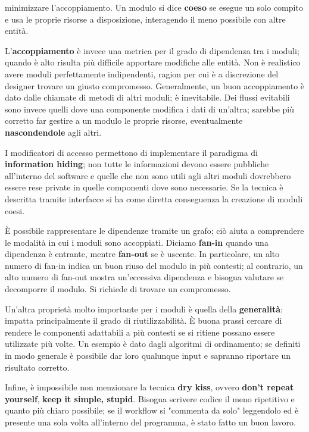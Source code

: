 minimizzare l'accoppiamento. Un modulo si dice \textbf{coeso} se esegue un solo compito e usa le proprie risorse a disposizione, interagendo il meno
possibile con altre entità.\par
L'\textbf{accoppiamento} è invece una metrica per il grado di dipendenza tra i moduli; quando è alto risulta più difficile apportare modifiche alle
entità. Non è realistico avere moduli perfettamente indipendenti, ragion per cui è a discrezione del designer trovare un giusto compromesso.
Generalmente, un buon accoppiamento è dato dalle chiamate di metodi di altri moduli; è inevitabile. Dei flussi evitabili sono invece quelli dove una
componente modifica i dati di un'altra; sarebbe più corretto far gestire a un modulo le proprie risorse, eventualmente \textbf{nascondendole} agli
altri.\par
I modificatori di accesso permettono di implementare il paradigma di \textbf{information hiding}; non tutte le informazioni devono essere pubbliche
all'interno del software e quelle che non sono utili agli altri moduli dovrebbero essere rese private in quelle componenti dove sono necessarie. Se la
tecnica è descritta tramite interfacce si ha come diretta conseguenza la creazione di moduli coesi.\newline

\noindent È possibile rappresentare le dipendenze tramite un grafo; ciò aiuta a comprendere le modalità in cui i moduli sono accoppiati. Diciamo
\textbf{fan-in} quando una dipendenza è entrante, mentre \textbf{fan-out} se è uscente. In particolare, un alto numero di fan-in indica un buon riuso
del modulo in più contesti; al contrario, un alto numero di fan-out mostra un'eccessiva dipendenza e bisogna valutare se decomporre il modulo. Si
richiede di trovare un compromesso.\par
Un'altra proprietà molto importante per i moduli è quella della \textbf{generalità}: impatta principalmente il grado di riutilizzabilità. È buona prassi
cercare di rendere le componenti adattabili a più contesti se si ritiene possano essere utilizzate più volte. Un esempio è dato dagli algoritmi di
ordinamento; se definiti in modo generale è possibile dar loro qualunque input e sapranno riportare un risultato corretto.\par
Infine, è impossibile non menzionare la tecnica \textbf{dry kiss}, ovvero \textbf{don't repeat yourself}, \textbf{keep it simple, stupid}. Bisogna
scrivere codice il meno ripetitivo e quanto più chiaro possibile; se il workflow si "commenta da solo" leggendolo ed è presente una sola volta
all'interno del programma, è stato fatto un buon lavoro.

